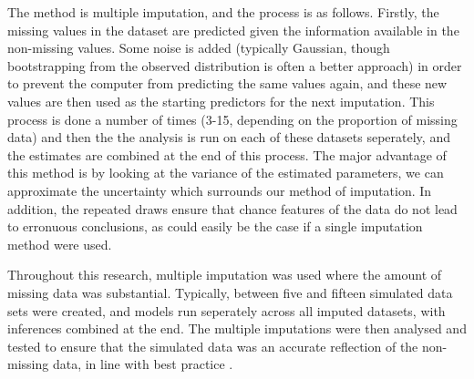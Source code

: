 The method is multiple imputation, and the process is as follows. Firstly, the missing values in the dataset are predicted given the information available in the non-missing values. Some noise is added (typically Gaussian, though bootstrapping from the observed distribution is often a better approach) \cite{gelman2007data} in order to prevent the computer from predicting the same values again, and these new values are then used as the starting predictors for the next imputation. This process is done a number of times (3-15, depending on the proportion of missing data) \cite{graham2009missing,little1987statistical} and then the the analysis is run on each of these datasets seperately, and the estimates are combined at the end of this process. The major advantage of this method is by looking at the variance of the estimated parameters, we can approximate the uncertainty which surrounds our method of imputation. In addition, the repeated draws ensure that chance features of the data do not lead to erronuous conclusions, as could easily be the case if a single imputation method were used.

Throughout this research, multiple imputation was used where the amount of missing data was substantial. Typically, between five and fifteen simulated data sets were created, and models run seperately across all imputed datasets, with inferences combined at the end. The multiple imputations were then analysed and tested to ensure that the simulated data was an accurate reflection of the non-missing data, in line with best practice \cite{abayomi2008diagnostics}.




